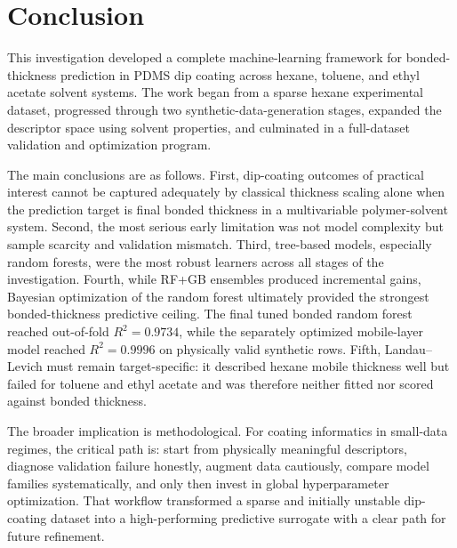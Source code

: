\documentclass[11pt]{article}
\begin{document}
\section{Conclusion}
This investigation developed a complete machine-learning framework for bonded-thickness prediction in PDMS dip coating across hexane, toluene, and ethyl acetate solvent systems. The work began from a sparse hexane experimental dataset, progressed through two synthetic-data-generation stages, expanded the descriptor space using solvent properties, and culminated in a full-dataset validation and optimization program.

The main conclusions are as follows. First, dip-coating outcomes of practical interest cannot be captured adequately by classical thickness scaling alone when the prediction target is final bonded thickness in a multivariable polymer-solvent system. Second, the most serious early limitation was not model complexity but sample scarcity and validation mismatch. Third, tree-based models, especially random forests, were the most robust learners across all stages of the investigation. Fourth, while RF+GB ensembles produced incremental gains, Bayesian optimization of the random forest ultimately provided the strongest bonded-thickness predictive ceiling. The final tuned bonded random forest reached out-of-fold $R^2 = 0.9734$, while the separately optimized mobile-layer model reached $R^2 = 0.9996$ on physically valid synthetic rows. Fifth, Landau--Levich must remain target-specific: it described hexane mobile thickness well but failed for toluene and ethyl acetate and was therefore neither fitted nor scored against bonded thickness.

The broader implication is methodological. For coating informatics in small-data regimes, the critical path is: start from physically meaningful descriptors, diagnose validation failure honestly, augment data cautiously, compare model families systematically, and only then invest in global hyperparameter optimization. That workflow transformed a sparse and initially unstable dip-coating dataset into a high-performing predictive surrogate with a clear path for future refinement.
\end{document}
